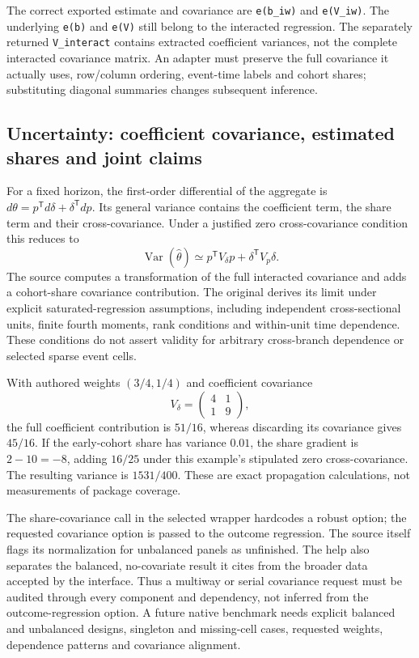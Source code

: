 The correct exported estimate and covariance are \texttt{e(b\_iw)} and
\texttt{e(V\_iw)}. The underlying \texttt{e(b)} and \texttt{e(V)} still belong
to the interacted regression. The separately returned \texttt{V\_interact}
contains extracted coefficient variances, not the complete interacted
covariance matrix. An adapter must preserve the full covariance it actually
uses, row/column ordering, event-time labels and cohort shares; substituting
diagonal summaries changes subsequent inference.
\citep{exec24_eventstudy_sources}

\subsection{Uncertainty: coefficient covariance, estimated shares and joint claims}
For a fixed horizon, the first-order differential of the aggregate is
$d\theta=p^{\mathsf T}d\delta+\delta^{\mathsf T}dp$. Its general variance
contains the coefficient term, the share term and their cross-covariance.
Under a justified zero cross-covariance condition this reduces to
\[
 \operatorname{Var}(\widehat\theta)\simeq
 p^{\mathsf T}V_\delta p+\delta^{\mathsf T}V_p\delta.
\]
The source computes a transformation of the full interacted covariance and
adds a cohort-share covariance contribution. The original derives its limit
under explicit saturated-regression assumptions, including independent
cross-sectional units, finite fourth moments, rank conditions and within-unit
time dependence. These conditions do not assert validity for arbitrary
cross-branch dependence or selected sparse event cells.
\citep{exec24_eventstudy_sources,exec24_eventstudy_original}

With authored weights $(3/4,1/4)$ and coefficient covariance
\[
 V_\delta=\begin{pmatrix}4&1\\1&9\end{pmatrix},
\]
the full coefficient contribution is $51/16$, whereas discarding its
covariance gives $45/16$. If the early-cohort share has variance $0.01$, the
share gradient is $2-10=-8$, adding $16/25$ under this example's stipulated
zero cross-covariance. The resulting variance is $1531/400$. These are exact
propagation calculations, not measurements of package coverage.
\citep{exec24_eventstudy_contract}

The share-covariance call in the selected wrapper hardcodes a robust option;
the requested covariance option is passed to the outcome regression. The
source itself flags its normalization for unbalanced panels as unfinished.
The help also separates the balanced, no-covariate result it cites from the
broader data accepted by the interface. Thus a multiway or serial covariance
request must be audited through every component and dependency, not inferred
from the outcome-regression option. A future native benchmark needs explicit
balanced and unbalanced designs, singleton and missing-cell cases, requested
weights, dependence patterns and covariance alignment.
\citep{exec24_eventstudy_sources}

